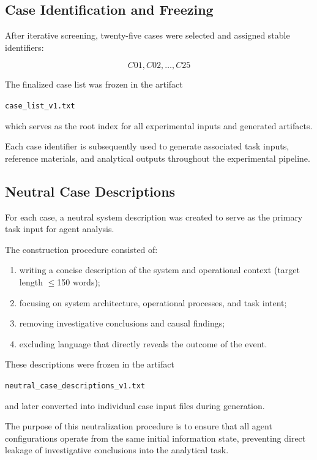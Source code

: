\subsection{Case Identification and Freezing}

After iterative screening, twenty-five cases were selected and assigned
stable identifiers:

\[
C01, C02, \ldots, C25
\]

The finalized case list was frozen in the artifact

\texttt{case\_list\_v1.txt}

which serves as the root index for all experimental inputs and generated
artifacts.

Each case identifier is subsequently used to generate associated task
inputs, reference materials, and analytical outputs throughout the
experimental pipeline.

\subsection{Neutral Case Descriptions}

For each case, a neutral system description was created to serve as the
primary task input for agent analysis.

The construction procedure consisted of:

\begin{enumerate}

\item writing a concise description of the system and operational context
(target length $\leq$150 words);

\item focusing on system architecture, operational processes, and task
intent;

\item removing investigative conclusions and causal findings;

\item excluding language that directly reveals the outcome of the event.

\end{enumerate}

These descriptions were frozen in the artifact

\texttt{neutral\_case\_descriptions\_v1.txt}

and later converted into individual case input files during generation.

The purpose of this neutralization procedure is to ensure that all agent
configurations operate from the same initial information state, preventing
direct leakage of investigative conclusions into the analytical task.

